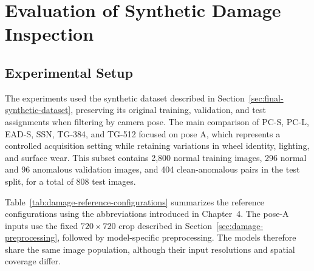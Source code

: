 \chapter{Evaluation of Synthetic Damage Inspection}

\section{Experimental Setup}
\label{sec:damage-experimental-setup}

The experiments used the synthetic dataset described in Section~\ref{sec:final-synthetic-dataset}, preserving its original training, validation, and test assignments when filtering by camera pose. The main comparison of PC-S, PC-L, EAD-S, SSN, TG-384, and TG-512 focused on pose A, which represents a controlled acquisition setting while retaining variations in wheel identity, lighting, and surface wear. This subset contains 2,800 normal training images, 296 normal and 96 anomalous validation images, and 404 clean-anomalous pairs in the test split, for a total of 808 test images. %

Table~\ref{tab:damage-reference-configurations} summarizes the reference configurations using the abbreviations introduced in Chapter~4. The pose-A inputs use the fixed \(720\times720\) crop described in Section~\ref{sec:damage-preprocessing}, followed by model-specific preprocessing. The models therefore share the same image population, although their input resolutions and spatial coverage differ. %

